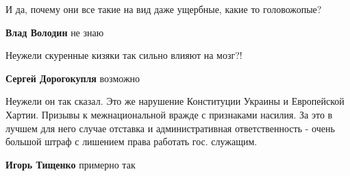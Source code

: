 \begin{itemize}
И да, почему они все такие на вид даже ущербные, какие то головожопые?

\begin{itemize}
 
\textbf{Влад Володин} не знаю
\end{itemize}

 
Неужели скуренные кизяки так сильно влияют на мозг?!

\begin{itemize}
 
\textbf{Сергей Дорогокупля} возможно
\end{itemize}

 

Неужели он так сказал. Это же нарушение Конституции Украины и Европейской
Хартии. Призывы к межнациональной вражде с признаками насилия. За это в лучшем
для него случае отставка и административная ответственность - очень большой
штраф с лишением права работать гос. служащим.

\begin{itemize}
 
\textbf{Игорь Тищенко} примерно так
\end{itemize}

 

\end{itemize}
